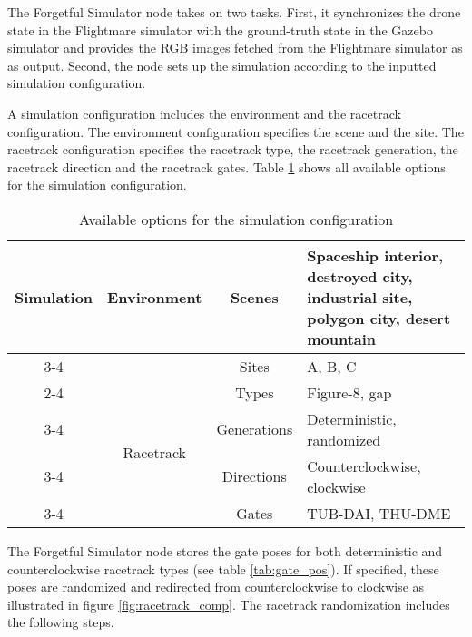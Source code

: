 The Forgetful Simulator node takes on two tasks.
First, it synchronizes the
drone state in the Flightmare simulator with the
ground-truth state in the Gazebo simulator and 
provides the RGB images fetched from the Flightmare simulator
as as output.
Second, the node sets up the simulation
according to the inputted 
simulation configuration.

A simulation configuration 
includes the environment and the racetrack configuration.
The environment configuration specifies
the scene and the site.
The racetrack configuration
specifies the 
racetrack type, the racetrack generation,
the racetrack direction and the racetrack gates.
Table \ref{tab:sim_config_opts} shows all available options for the simulation configuration.
\begin{table}[h]
    \caption{Available options for the simulation configuration
    \label{tab:sim_config_opts}}
    \centering
    \begin{tabular}{|c|c|c|p{6cm}|} \hline
        \multirow{8}{*}{Simulation} 
        &\multirow{4}{*}{Environment}   
        &\multirow{3}{*}{Scenes}
        &Spaceship interior, destroyed city, industrial site, polygon city, desert mountain    
        \\\cline{3-4}
        &
        &Sites
        &A, B, C
        \\\cline{2-4}
        &\multirow{4}{*}{Racetrack}
        &Types
        &Figure-8, gap                                                                         \\\cline{3-4}
        &
        &Generations
        &Deterministic, randomized
        \\\cline{3-4}
        &
        &Directions
        &Counterclockwise, clockwise
        \\\cline{3-4}
        &
        &Gates
        &TUB-DAI, THU-DME
        \\\hline
    \end{tabular}
\end{table}
The Forgetful Simulator node stores 
the gate poses for both 
deterministic and counterclockwise
racetrack types
(see table \ref{tab:gate_pos}).
If specified,
these poses are randomized
and redirected from counterclockwise to clockwise
as illustrated in figure \ref{fig:racetrack_comp}.
The racetrack randomization 
includes the following steps.
